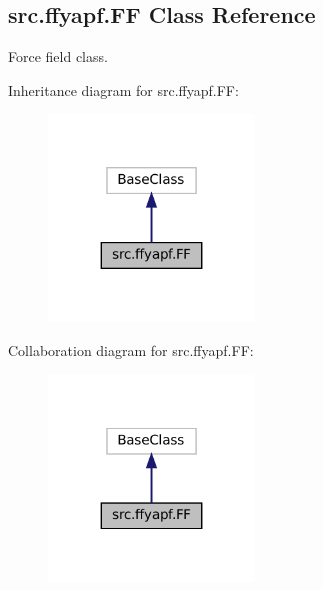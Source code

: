 \hypertarget{classsrc_1_1ffyapf_1_1FF}{}\subsection{src.\+ffyapf.\+FF Class Reference}
\label{classsrc_1_1ffyapf_1_1FF}


Force field class.  




Inheritance diagram for src.\+ffyapf.\+FF\+:
\nopagebreak
\begin{figure}[H]
\begin{center}
\leavevmode
\includegraphics[width=155pt]{classsrc_1_1ffyapf_1_1FF__inherit__graph}
\end{center}
\end{figure}


Collaboration diagram for src.\+ffyapf.\+FF\+:
\nopagebreak
\begin{figure}[H]
\begin{center}
\leavevmode
\includegraphics[width=155pt]{classsrc_1_1ffyapf_1_1FF__coll__graph}
\end{center}
\end{figure}
